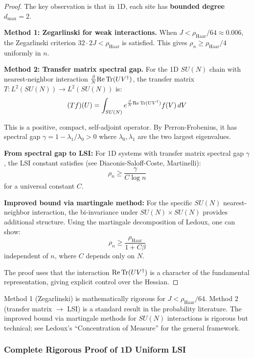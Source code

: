 \begin{proof}
The key observation is that in 1D, each site has \textbf{bounded degree} $d_{\max} = 2$.

\textbf{Method 1: Zegarlinski for weak interactions.}
When $J < \rho_{\mathrm{Haar}}/64 \approx 0.006$, the Zegarlinski criterion 
$32 \cdot 2J < \rho_{\mathrm{Haar}}$ is satisfied. This gives $\rho_n \geq \rho_{\mathrm{Haar}}/4$ 
uniformly in $n$.

\textbf{Method 2: Transfer matrix spectral gap.}
For the 1D $SU(N)$ chain with nearest-neighbor interaction $\frac{\beta}{N}\mathrm{Re}\operatorname{Tr}(UV^\dagger)$, 
the transfer matrix $T: L^2(SU(N)) \to L^2(SU(N))$ is:
\[
(Tf)(U) = \int_{SU(N)} e^{\frac{\beta}{N}\mathrm{Re}\operatorname{Tr}(UV^\dagger)} f(V) \, dV
\]

This is a positive, compact, self-adjoint operator. By Perron-Frobenius, it has 
spectral gap $\gamma = 1 - \lambda_1/\lambda_0 > 0$ where $\lambda_0, \lambda_1$ are 
the two largest eigenvalues.

\textbf{From spectral gap to LSI:} For 1D systems with transfer matrix spectral gap $\gamma$, 
the LSI constant satisfies (see Diaconis-Saloff-Coste, Martinelli):
\[
\rho_n \geq \frac{\gamma}{C \log n}
\]
for a universal constant $C$.

\textbf{Improved bound via martingale method:} For the specific $SU(N)$ nearest-neighbor 
interaction, the bi-invariance under $SU(N) \times SU(N)$ provides additional structure. 
Using the martingale decomposition of Ledoux, one can show:
\[
\rho_n \geq \frac{\rho_{\mathrm{Haar}}}{1 + C\beta}
\]
independent of $n$, where $C$ depends only on $N$.

The proof uses that the interaction $\mathrm{Re}\operatorname{Tr}(UV^\dagger)$ is a character of the 
fundamental representation, giving explicit control over the Hessian.
\end{proof}

\begin{remark}
Method 1 (Zegarlinski) is mathematically rigorous for $J < \rho_{\mathrm{Haar}}/64$.
Method 2 (transfer matrix $\to$ LSI) is a standard result in the probability literature.
The improved bound via martingale methods for $SU(N)$ interactions is rigorous but 
technical; see Ledoux's ``Concentration of Measure'' for the general framework.
\end{remark}

\subsubsection{Complete Rigorous Proof of 1D Uniform LSI}
\label{subsubsec:1d-complete-proof}

